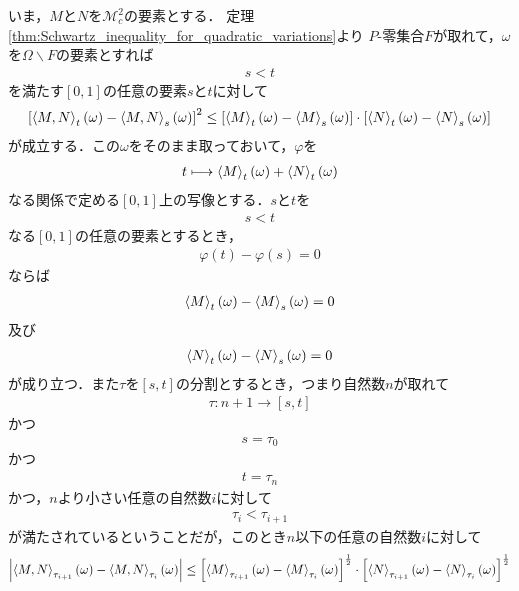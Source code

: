 	いま，$M$と$N$を$\mathscr{M}_{c}^{2}$の要素とする．
	定理\ref{thm:Schwartz_inequality_for_quadratic_variations}より
	$P$-零集合$F$が取れて，$\omega$を$\Omega \backslash F$の要素とすれば
	\begin{align}
		s < t
	\end{align}
	を満たす$[0,1]$の任意の要素$s$と$t$に対して
	\begin{align}
		\left[\inprod<M,N>_{t}(\omega) - \inprod<M,N>_{s}(\omega)\right]^{2}
		\leq \left[\inprod<M>_{t}(\omega) - \inprod<M>_{s}(\omega)\right] 
		\cdot \left[\inprod<N>_{t}(\omega) - \inprod<N>_{s}(\omega)\right]
	\end{align}
	が成立する．この$\omega$をそのまま取っておいて，$\varphi$を
	\begin{align}
		t \longmapsto \inprod<M>_{t}(\omega) + \inprod<N>_{t}(\omega)
	\end{align}
	なる関係で定める$[0,1]$上の写像とする．$s$と$t$を
	\begin{align}
		s < t
	\end{align}
	なる$[0,1]$の任意の要素とするとき，
	\begin{align}
		\varphi(t) - \varphi(s) = 0
	\end{align}
	ならば
	\begin{align}
		\inprod<M>_{t}(\omega) - \inprod<M>_{s}(\omega) = 0
	\end{align}
	及び
	\begin{align}
		\inprod<N>_{t}(\omega) - \inprod<N>_{s}(\omega) = 0
	\end{align}
	が成り立つ．また$\tau$を$[s,t]$の分割とするとき，つまり自然数$n$が取れて
	\begin{align}
		\tau:n+1 \longrightarrow [s,t]
	\end{align}
	かつ
	\begin{align}
		s = \tau_{0}
	\end{align}
	かつ
	\begin{align}
		t = \tau_{n}
	\end{align}
	かつ，$n$より小さい任意の自然数$i$に対して
	\begin{align}
		\tau_{i} < \tau_{i+1}
	\end{align}
	が満たされているということだが，このとき$n$以下の任意の自然数$i$に対して
	\begin{align}
		\left|\inprod<M,N>_{\tau_{i+1}}(\omega) - \inprod<M,N>_{\tau_{i}}(\omega) \right|
		\leq \left[\inprod<M>_{\tau_{i+1}}(\omega) - \inprod<M>_{\tau_{i}}(\omega)\right]^{\frac{1}{2}} \cdot
		\left[\inprod<N>_{\tau_{i+1}}(\omega) - \inprod<N>_{\tau_{i}}(\omega)\right]^{\frac{1}{2}}
	\end{align}

